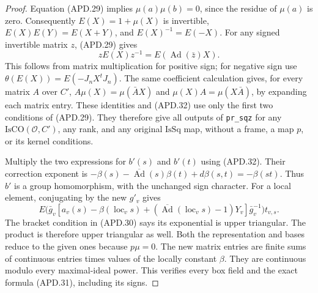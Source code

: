 \documentclass[11pt,a4paper]{article}
\numberwithin{equation}{section}
\theoremstyle{remark}\newtheorem{remark}[theorem]{Remark}
\begin{document}
\begin{proof}
Equation (APD.29) implies \(\mu(a)\mu(b)=0\), since the
residue of \(\mu(a)\) is zero.  Consequently
\(E(X)=1+\mu(X)\) is invertible,
\(E(X)E(Y)=E(X+Y)\), and \(E(X)^{-1}=E(-X)\).
For any signed invertible matrix \(z\), (APD.29) gives
\[
 zE(X)z^{-1}=E(\operatorname{Ad}(\bar z)X).                \tag{APD.32}
\]
This follows from matrix multiplication for positive sign; for
negative sign use \(\theta(E(X))=E(-J_nX^tJ_n)\).
The same coefficient calculation gives, for every matrix \(A\)
over \(C'\),
\(A\mu(X)=\mu(\bar A X)\) and
\(\mu(X)A=\mu(X\bar A)\), by expanding each matrix entry.
These identities and (APD.32) use only the first two conditions
of (APD.29).  They therefore give all outputs of
\texttt{pr\_\allowbreak sqz} for any \(\mathrm{IsCO}(\mathcal O,C')\),
any rank, and any original \(\mathrm{IsSq}\) map, without a
frame, a map \(p\), or its kernel conditions.

Multiply the two expressions for \(b'(s)\) and \(b'(t)\)
using (APD.32).  Their correction exponent is
\(-\beta(s)-\overline{\operatorname{Ad}}(s)\beta(t)
 +d\beta(s,t)=-\beta(st)\).  Thus \(b'\) is a group
homomorphism, with the unchanged sign character.  For a local
element, conjugating by the new \(g'_v\) gives
\[
 E\bigl(\bar g_v[
     a_v(s)-\beta(\operatorname{loc}_v s)
       +(\overline{\operatorname{Ad}}(\operatorname{loc}_v s)-1)Y_v
                ]\bar g_v^{-1}\bigr)t_{v,s}.              \tag{APD.33}
\]
The bracket condition in (APD.30) says its exponential is upper
triangular.  The product is therefore upper triangular as well.
Both the representation and bases reduce to the given ones because
\(p\mu=0\).  The new matrix entries are finite sums of
continuous entries times values of the locally constant \(\beta\).
They are continuous modulo every maximal-ideal power.  This
verifies every box field and the exact formula (APD.31), including
its signs.
\end{proof}

\end{document}
